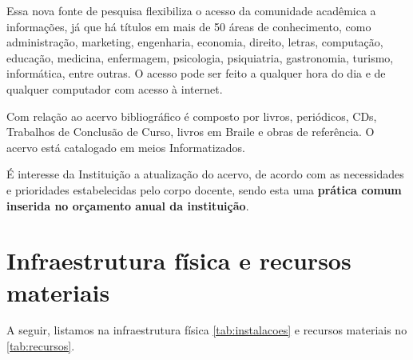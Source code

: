 \documentclass[
	12pt,				%
	openright,			%
	twoside,			%
	a4paper,			%
	chapter=TITLE,		%
	english,			%
	french,				%
	spanish,			%
	brazil,				%
	]{abntex2}
\begin{document}
Essa nova fonte de pesquisa flexibiliza o acesso da comunidade acadêmica a informações, já que há títulos em mais de 50 áreas de conhecimento, como administração, marketing, engenharia, economia, direito, letras, computação, educação, medicina, enfermagem, psicologia, psiquiatria, gastronomia, turismo, informática,  entre outras. O acesso pode ser feito a qualquer hora do dia e de qualquer computador com acesso à internet.

Com relação ao acervo bibliográfico é composto por livros, periódicos, CDs, Trabalhos de Conclusão de Curso, livros em Braile e  obras de referência. O acervo está catalogado em meios Informatizados.

É interesse da Instituição a atualização do acervo, de acordo com as necessidades e prioridades estabelecidas pelo corpo docente, sendo esta uma \textbf{prática comum inserida no orçamento anual da instituição}.


\section{Infraestrutura física e recursos materiais}

A seguir, listamos na infraestrutura física \autoref{tab:instalacoes} e recursos
materiais no \autoref{tab:recursos}.
\end{document}
